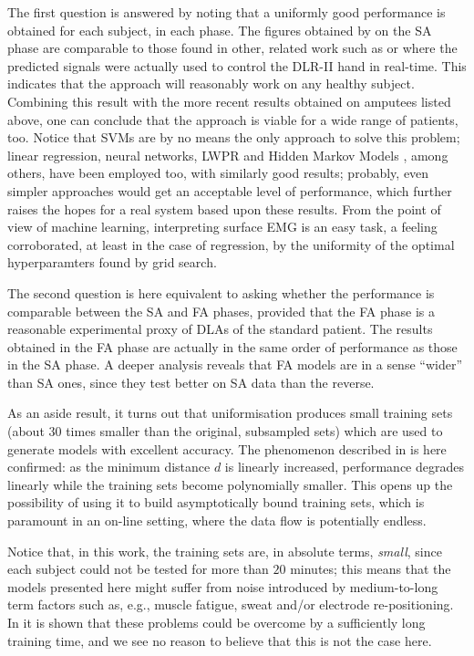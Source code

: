 \documentclass[10pt]{bmc_article}
\newenvironment{bmcformat}
  {\begin{raggedright}\baselineskip20pt\sloppy\setboolean{publ}{false}}
  {\end{raggedright}\baselineskip20pt\sloppy}
\begin{document}
\begin{bmcformat}
The first question is answered by noting that a uniformly good
performance is obtained for each subject, in each phase.
The figures obtained by on the SA phase are
comparable to those found in other, related work such as
\cite{ramos,cipriani} or \cite{2008.BioCyb} where the predicted signals
were actually used to control the DLR-II hand in real-time. This
indicates that the approach will reasonably work on any healthy subject.
Combining this result with the more recent results obtained on amputees
listed above, one can conclude that the approach is viable for a wide range
of patients, too. Notice that SVMs are by no means the only approach to
solve this problem; linear regression, neural networks, LWPR \cite{lwpr}
and Hidden Markov Models \cite{chan2005}, among others,
have been employed too, with similarly good results; probably,
even simpler approaches would get an acceptable level of performance,
which further raises the hopes for a real system based upon these
results. From the point of view of machine learning, interpreting surface
EMG is an easy task, a feeling corroborated, at least in the case of
regression, by the uniformity of the optimal hyperparamters found by
grid search.

The second question is here equivalent to asking whether the performance is
comparable between the SA and FA phases, provided that the FA phase is a
reasonable experimental proxy of DLAs of the standard patient.
The results obtained in the FA phase are actually
in the same order of performance as those in the SA phase.
A deeper analysis reveals that FA models are in a sense ``wider'' than
SA ones, since they test better on SA data than the reverse.

As an aside result, it turns out that uniformisation produces
small training sets (about $30$ times smaller than the original, subsampled
sets) which are used to generate models with excellent accuracy. The
phenomenon described in \cite{2008.BioCyb} is here confirmed:
as the minimum distance $d$ is linearly increased, performance degrades linearly
while the training sets become polynomially smaller. This opens up the
possibility of using it to build asymptotically bound training sets,
which is paramount in an on-line setting, where the data flow is
potentially endless.

Notice that, in this work, the training sets
are, in absolute terms, \emph{small}, since each subject could not be
tested for more than $20$ minutes; this means that the models presented
here might suffer from noise introduced by medium-to-long term factors
such as, e.g., muscle fatigue, sweat and/or electrode re-positioning.
In \cite{2008.BioCyb} it is shown that these problems could be overcome
by a sufficiently long training time, and we see no reason to believe that
this is not the case here.


\end{bmcformat}
\end{document}

